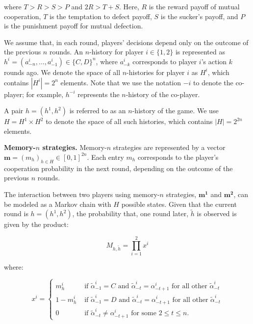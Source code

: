 \documentclass{article}
\theoremstyle{definition}
\begin{document}
where $T > R > S > P$ and $2 R > T + S$. Here, $R$ is the reward payoff of mutual
cooperation, $T$ is the temptation to defect payoff, $S$ is the sucker's payoff,
and $P$ is the punishment payoff for mutual defection.

We assume that, in each round, players' decisions depend only on the outcome of
the previous \(n\) rounds. An \(n\)-history for player \(i \in \{1, 2\}\) is
represented as \(h^i = (a^i_{-n}, \ldots, a^i_{-1}) \in \{C, D\}^n\), where
\(a^i_{-k}\) corresponds to player \(i\)'s action \(k\) rounds ago. We denote
the space of all \(n\)-histories for player \(i\) as \(H^i\), which contains
\(|H^i| = 2^n\) elements. Note that we use the notation \(-i\) to denote the
co-player; for example, \(h^{-i}\) represents the \(n\)-history of the
co-player.

A pair \(h = (h^1, h^2)\) is referred to as an \(n\)-history of the game. We use
\(H = H^1 \times H^2\) to denote the space of all such histories, which contains
\(|H| = 2^{2n}\) elements.


{\bf Memory-\(n\) strategies.} Memory-\(n\) strategies are represented by a
vector \(\mathbf{m} = (m_h)_{h\in H} \in [0,1]^{2n}\). Each entry \(m_h\)
corresponds to the player's cooperation probability in the next round, depending
on the outcome of the previous \(n\) rounds.

The interaction between two players using memory-\(n\) strategies,
\(\mathbf{m^{1}}\) and \(\mathbf{m^{2}}\), can be modeled as a Markov chain with
\(H\) possible states. Given that the current round is \(h = (h^{1}, h^{2})\),
the probability that, one round later, \(\tilde{h}\) is observed is given by the
product:

\[
M_{h, \tilde{h}} = \prod_{i=1}^{2} x^{i}
\]

where:

\[
x^i = 
\begin{cases}
  m^{i}_{h} & \text{ if } \tilde{\alpha}^i_{-1} = C \text{ and } \tilde{\alpha}^i_{-t} = \alpha^i_{-t + 1} \text{ for all other } \tilde{\alpha}^i_{-t}\\
  1 - m^{i}_{h} & \text{ if } \tilde{\alpha}^i_{-1} = D \text{ and } \tilde{\alpha}^i_{-t} = \alpha^i_{-t + 1} \text{ for all other } \tilde{\alpha}^i_{-t}\\
  0 & \text{ if } \tilde{\alpha}^i_{-t} \neq  \alpha^i_{-t + 1} \text{ for some } 2 \leq t \leq n.
\end{cases}
\]
\end{document}

